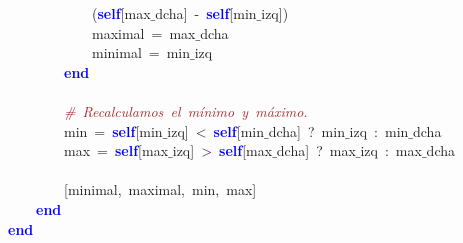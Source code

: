 \mbox{}\ \ \ \ \ \ \ \ \ \ \ \ \textcolor{BrickRed}{(}\textbf{\textcolor{Blue}{self}}\textcolor{BrickRed}{[}max$\_$dcha\textcolor{BrickRed}{]}\ \textcolor{BrickRed}{-}\ \textbf{\textcolor{Blue}{self}}\textcolor{BrickRed}{[}min$\_$izq\textcolor{BrickRed}{])} \\
\mbox{}\ \ \ \ \ \ \ \ \ \ \ \ maximal\ \textcolor{BrickRed}{=}\ max$\_$dcha \\
\mbox{}\ \ \ \ \ \ \ \ \ \ \ \ minimal\ \textcolor{BrickRed}{=}\ min$\_$izq \\
\mbox{}\ \ \ \ \ \ \ \ \textbf{\textcolor{Blue}{end}} \\
\mbox{}\ \ \ \ \ \ \ \  \\
\mbox{}\ \ \ \ \ \ \ \ \textit{\textcolor{Brown}{\#\ Recalculamos\ el\ mínimo\ y\ máximo.\ \ }} \\
\mbox{}\ \ \ \ \ \ \ \ min\ \textcolor{BrickRed}{=}\ \textbf{\textcolor{Blue}{self}}\textcolor{BrickRed}{[}min$\_$izq\textcolor{BrickRed}{]}\ \textcolor{BrickRed}{\textless{}}\ \textbf{\textcolor{Blue}{self}}\textcolor{BrickRed}{[}min$\_$dcha\textcolor{BrickRed}{]}\ \textcolor{BrickRed}{?}\ min$\_$izq\ \textcolor{BrickRed}{:}\ min$\_$dcha \\
\mbox{}\ \ \ \ \ \ \ \ max\ \textcolor{BrickRed}{=}\ \textbf{\textcolor{Blue}{self}}\textcolor{BrickRed}{[}max$\_$izq\textcolor{BrickRed}{]}\ \textcolor{BrickRed}{\textgreater{}}\ \textbf{\textcolor{Blue}{self}}\textcolor{BrickRed}{[}max$\_$dcha\textcolor{BrickRed}{]}\ \textcolor{BrickRed}{?}\ max$\_$izq\ \textcolor{BrickRed}{:}\ max$\_$dcha \\
\mbox{} \\
\mbox{}\ \ \ \ \ \ \ \ \textcolor{BrickRed}{[}minimal\textcolor{BrickRed}{,}\ maximal\textcolor{BrickRed}{,}\ min\textcolor{BrickRed}{,}\ max\textcolor{BrickRed}{]}\  \\
\mbox{}\ \ \ \ \textbf{\textcolor{Blue}{end}}\  \\
\mbox{}\textbf{\textcolor{Blue}{end}} \\
\mbox{} 
